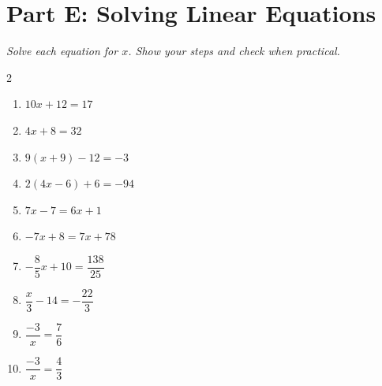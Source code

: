 \documentclass[11pt]{article}
\begin{document}
\section*{Part E: Solving Linear Equations}
\noindent\textit{Solve each equation for $x$. Show your steps and check when practical.}
\begin{multicols}{2}
\begin{enumerate}
  \item $10x + 12 = 17$
  \vspace{1.9cm}
  \item $4x + 8 = 32$
  \vspace{1.9cm}
  \item $9(x + 9) - 12 = -3$
  \vspace{1.9cm}
  \item $2(4x - 6) + 6 = -94$
  \vspace{1.9cm}
  \item $7x - 7 = 6x + 1$
  \vspace{1.9cm}
  \item $-7x + 8 = 7x + 78$
  \vspace{1.9cm}
  \item $-\dfrac{8}{5}x + 10 = \dfrac{138}{25}$
  \vspace{1.9cm}
  \item $\dfrac{x}{3} - 14 = -\dfrac{22}{3}$
  \vspace{1.9cm}
  \item $\dfrac{-3}{x} = \dfrac{7}{6}$
  \vspace{1.9cm}
  \item $\dfrac{-3}{x} = \dfrac{4}{3}$
  \vspace{1.9cm}
\end{enumerate}
\end{multicols}
\end{document}
